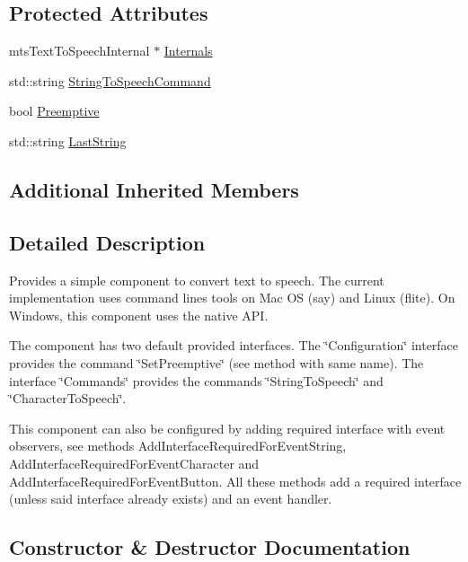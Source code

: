 \subsection*{Protected Attributes}
\begin{DoxyCompactItemize}
\item 
mts\+Text\+To\+Speech\+Internal $\ast$ \hyperlink{classmts_text_to_speech_a3ef89e41ddb760539b723b6c46f1b463}{Internals}
\item 
std\+::string \hyperlink{classmts_text_to_speech_aadd1b9d1f241afe95b2f2b7fa34422a8}{String\+To\+Speech\+Command}
\item 
bool \hyperlink{classmts_text_to_speech_a78a3e0004193dbd080e027c3b7a97fa8}{Preemptive}
\item 
std\+::string \hyperlink{classmts_text_to_speech_a8b6a91cf728698b9bd49ac8d888bbc48}{Last\+String}
\end{DoxyCompactItemize}
\subsection*{Additional Inherited Members}


\subsection{Detailed Description}
Provides a simple component to convert text to speech. The current implementation uses command lines tools on Mac O\+S (say) and Linux (flite). On Windows, this component uses the native A\+P\+I.

The component has two default provided interfaces. The \char`\"{}\+Configuration\char`\"{} interface provides the command \char`\"{}\+Set\+Preemptive\char`\"{} (see method with same name). The interface \char`\"{}\+Commands\char`\"{} provides the commands \char`\"{}\+String\+To\+Speech\char`\"{} and \char`\"{}\+Character\+To\+Speech\char`\"{}.

This component can also be configured by adding required interface with event observers, see methods Add\+Interface\+Required\+For\+Event\+String, Add\+Interface\+Required\+For\+Event\+Character and Add\+Interface\+Required\+For\+Event\+Button. All these methods add a required interface (unless said interface already exists) and an event handler. 

\subsection{Constructor \& Destructor Documentation}
\hypertarget{classmts_text_to_speech_a9522af18806f0a7db41b744a3fca01be}{}

